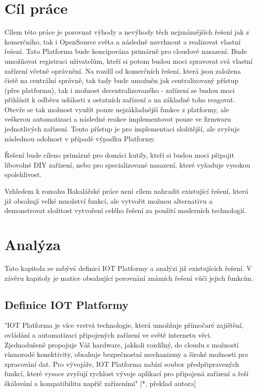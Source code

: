 \documentclass[thesis=B,czech]{FITthesis}[2019/12/23]
\begin{document}
\chapter{Cíl práce}
    Cílem této práce je porovnat výhody a nevýhody těch nejznámějších řešení jak z komerčního, tak i OpenSource světa a následně navrhnout a realizovat vlastní řešení. Tato Platforma bude koncipována primárně pro cloudové nasazení. Bude umožňovat registraci uživatelům, kteří si potom budou moci spravovat svá vlastní zařízení včetně oprávnění. Na rozdíl od komerčních řešení, která jsou založena čistě na centrální správně, tak tady bude umožněn jak centralizovaný přístup (přes platformu), tak i možnost decentralizovaného - zařízení se budou moci přihlásit k odběru události z ostatních zařízení a na základně toho reagovat. Otevře se tak možnost využít pouze nejzákladnější funkce z platformy, ale veškerou automatizaci a následné reakce implementovat pouze ve firmwaru jednotlivých zařízení. Tento přístup je pro implementaci složitější, ale zvyšuje následnou odolnost v případě výpadku Platformy.

    Řešení bude cíleno primárně pro domáci kutily, kteří si budou moci připojit libovolné DIY zařízení, nebo pro specializované nasazení, které vyžaduje vysokou spolehlivost.

    Vzhledem k rozsahu Bakalářské práce není cílem nahradit existující řešení, která již obsahují velké množství funkcí, ale vytvořit možnou alternativu a demonstrovat složitost vytvoření celého řešení za použití moderních technologií. 

    

\chapter{Analýza}
Tato kapitola se zabývá definici IOT Platformy a analýzi již existujících řešení. V závěru kapitoly je matice obsahující porovnání známích řešení vůči jejich funkcím.

\section{Definice IOT Platformy}
    "IOT Platforma je více vrstvá technologie, která umožňuje přímočaré zajištění, ovládání a automatizaci připojených zařízení ve světě internetu věci. Zjednodušeně propojuje Váš hardware, jakkoli rozdílný, do cloudu s možností různorodé konektivity, obsahuje bezpečnostní mechanizmy a široké možnosti pro zpracování dat. Pro vývojáře, IOT Platforma nabízí soubor předpřipravených funkcí, které vysoce zvyšují rychlost vývoje aplikací pro připojená zařízení a řeší škálování a kompatibilitu napříč zařízeními" [*, překlad autora] %
\end{document}
